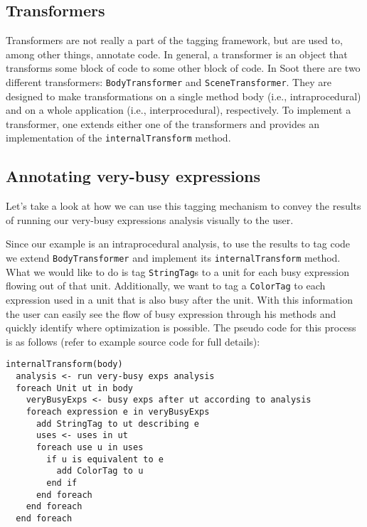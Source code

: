 \documentclass{article}
\newcommand{\code}[1]{\texttt{\small #1}}
\begin{document}
\subsection{Transformers}
\label{section:transf}

Transformers are not really a part of the tagging framework, but are
used to, among other things, annotate code. In general, a transformer
is an object that transforms some block of code to some other block of
code. In Soot there are two different transformers:
\code{BodyTransformer} and \code{SceneTransformer}. They are designed
to make transformations on a single method body (i.e.,
intraprocedural) and on a whole application (i.e., interprocedural),
respectively. To implement a transformer, one extends either one of
the transformers and provides an implementation of the
\code{internalTransform} method.

\subsection{Annotating very-busy expressions}
\label{section:vbeannot}

Let's take a look at how we can use this tagging mechanism to convey
the results of running our very-busy expressions analysis visually to
the user.

Since our example is an intraprocedural analysis, to use the results
to tag code we extend \code{BodyTransformer} and implement its
\code{internalTransform} method. What we would like to do is tag
\code{StringTag}s to a unit for each busy expression flowing out of
that unit. Additionally, we want to tag a \code{ColorTag} to each
expression used in a unit that is also busy after the unit. With this
information the user can easily see the flow of busy expression
through his methods and quickly identify where optimization is
possible. The pseudo code for this process is as follows (refer to
example source code for full details):
\begin{center}
  \begin{minipage}{0.9 \linewidth}
\begin{verbatim}
internalTransform(body)
  analysis <- run very-busy exps analysis
  foreach Unit ut in body
    veryBusyExps <- busy exps after ut according to analysis
    foreach expression e in veryBusyExps
      add StringTag to ut describing e
      uses <- uses in ut
      foreach use u in uses
        if u is equivalent to e
          add ColorTag to u
        end if
      end foreach
    end foreach
  end foreach
\end{verbatim}
  \end{minipage}
\end{center}
\end{document}
